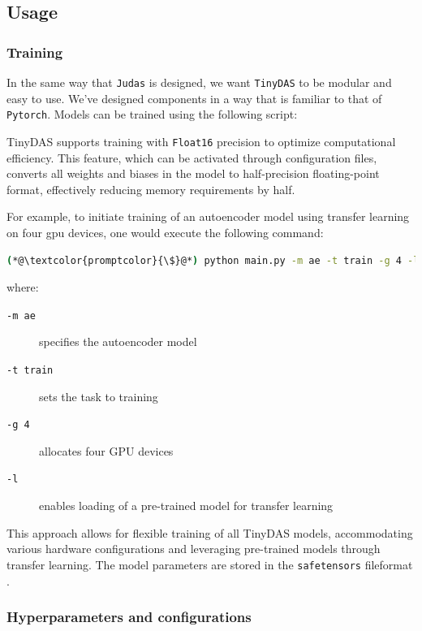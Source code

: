 \subsection{Usage}

\subsubsection{Training}

In the same way that \texttt{Judas} is designed, we want \texttt{TinyDAS} to be modular and easy to use. We've designed components in a way that is familiar to that of \texttt{Pytorch}\cite{paszke2019pytorch}. Models can be trained using the following script:



TinyDAS supports training with \texttt{Float16} precision to optimize computational efficiency. This feature, which can be activated through configuration files, converts all weights and biases in the model to half-precision floating-point format, effectively reducing memory requirements by half.

For example, to initiate training of an autoencoder model using transfer learning on four \acrshort{gpu} devices, one would execute the following command:
\begin{lstlisting}[style=shellcommand, language=bash]
(*@\textcolor{promptcolor}{\$}@*) python main.py -m ae -t train -g 4 -l
\end{lstlisting}

where:
\begin{description}
\item[\texttt{-m ae}] specifies the autoencoder model
\item[\texttt{-t train}] sets the task to training
\item[\texttt{-g 4}] allocates four GPU devices
\item[\texttt{-l}] enables loading of a pre-trained model for transfer learning
\end{description}

This approach allows for flexible training of all TinyDAS models, accommodating various hardware configurations and leveraging pre-trained models through transfer learning. The model parameters are stored in the \texttt{safetensors} fileformat \cite{safetensors}.

\subsubsection{Hyperparameters and configurations}


